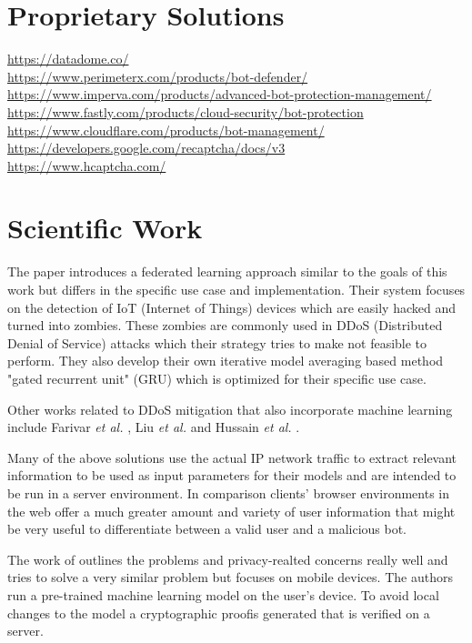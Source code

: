 \documentclass[
    fontsize=12pt,
    headings=small,
    parskip=half,           %
    bibliography=totoc,
    numbers=noenddot,       %
    open=any,               %
    final                   %
    ]{scrreprt}
\begin{document}
\section{Proprietary Solutions}

\url{https://datadome.co/} \\
\url{https://www.perimeterx.com/products/bot-defender/} \\
\url{https://www.imperva.com/products/advanced-bot-protection-management/} \\
\url{https://www.fastly.com/products/cloud-security/bot-protection} \\
\url{https://www.cloudflare.com/products/bot-management/} \\
\url{https://developers.google.com/recaptcha/docs/v3} \\
\url{https://www.hcaptcha.com/} \\


\section{Scientific Work}

The paper \cite{LiJi2021} introduces a federated learning approach similar to the goals of this work but differs in the specific use case and implementation. Their system focuses on the detection of IoT (Internet of Things) devices which are easily hacked and turned into zombies. These zombies are commonly used in DDoS (Distributed Denial of Service) attacks which their strategy tries to make not feasible to perform. They also develop their own iterative model averaging based method "gated recurrent unit" (GRU) which is optimized for their specific use case.

Other works related to DDoS mitigation that also incorporate machine learning include Farivar \emph{et al.} \cite{FaFa2020}, Liu \emph{et al.} \cite{8594641} and Hussain \emph{et al.} \cite{9000893}.

Many of the above solutions use the actual IP network traffic to extract relevant information to be used as input parameters for their models and are intended to be run in a server environment. In comparison clients' browser environments in the web offer a much greater amount and variety of user information that might be very useful to differentiate between a valid user and a malicious bot.

The work of \cite{PETS2021} outlines the problems and privacy-realted concerns really well and tries to solve a very similar problem but focuses on mobile devices. The authors run a pre-trained machine learning model on the user's device. To avoid local changes to the model a cryptographic proofis generated that is verified on a server.
\end{document}
